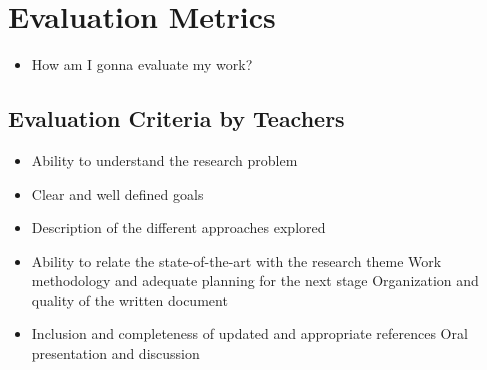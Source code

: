 \section{Evaluation Metrics}

\begin{itemize}
  \item How am I gonna evaluate my work?
\end{itemize}

\subsection{Evaluation Criteria by Teachers} %
\label{sub:evaluation_criteria}
\begin{itemize}
  \item Ability to understand the research problem
  \item Clear and well defined goals
  \item Description of the different approaches explored
  \item Ability to relate the state-of-the-art with the research theme Work methodology and adequate planning for the next stage Organization and quality of the written document
  \item Inclusion and completeness of updated and appropriate references Oral presentation and discussion
\end{itemize}
